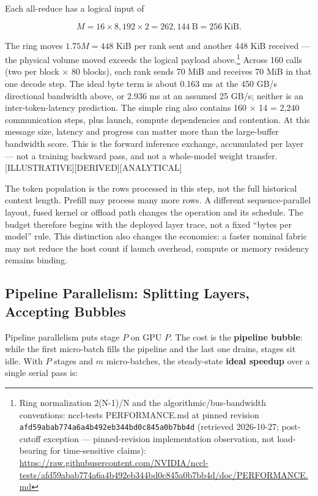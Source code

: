 Each all-reduce has a logical input of

\[
M = 16 \times 8{,}192 \times 2 = 262{,}144\ \text{B} = 256\ \text{KiB}.
\]

The ring moves \(1.75M = 448\) KiB per rank sent and another 448 KiB
received --- the physical volume moved exceeds the logical payload
above.\footnote{Ring normalization 2(N-1)/N and the
  algorithmic/bus-bandwidth conventions: nccl-tests PERFORMANCE.md at
  pinned revision \texttt{afd59abab774a6a4b492eb344bd0c845a0b7bb4d}
  (retrieved 2026-10-27; post-cutoff exception --- pinned-revision
  implementation observation, not load-bearing for time-sensitive
  claims):
  \url{https://raw.githubusercontent.com/NVIDIA/nccl-tests/afd59abab774a6a4b492eb344bd0c845a0b7bb4d/doc/PERFORMANCE.md}}
Across 160 calls (two per block × 80 blocks), each rank sends 70 MiB and
receives 70 MiB in that one decode step. The ideal byte term is about
0.163 ms at the 450 GB/s directional bandwidth above, or 2.936 ms at an
assumed 25 GB/s; neither is an inter-token-latency prediction. The
simple ring also contains 160 × 14 = 2,240 communication steps, plus
launch, compute dependencies and contention. At this message size,
latency and progress can matter more than the large-buffer bandwidth
score. This is the forward inference exchange, accumulated per layer ---
not a training backward pass, and not a whole-model weight transfer.
\mbox{{[}ILLUSTRATIVE{]}}\hspace{0pt}\mbox{{[}DERIVED{]}}\hspace{0pt}\mbox{{[}ANALYTICAL{]}}

The token population is the rows processed in this step, not the full
historical context length. Prefill may process many more rows. A
different sequence-parallel layout, fused kernel or offload path changes
the operation and its schedule. The budget therefore begins with the
deployed layer trace, not a fixed ``bytes per model'' rule. This
distinction also changes the economics: a faster nominal fabric may not
reduce the host count if launch overhead, compute or memory residency
remains binding.

\subsection{Pipeline Parallelism: Splitting Layers, Accepting
Bubbles}\label{pipeline-parallelism-splitting-layers-accepting-bubbles}

Pipeline parallelism puts stage \(P\) on GPU \(P\). The cost is the
\textbf{pipeline bubble}: while the first micro-batch fills the pipeline
and the last one drains, stages sit idle. With \(P\) stages and \(m\)
micro-batches, the steady-state \textbf{ideal speedup} over a single
serial pass is:

